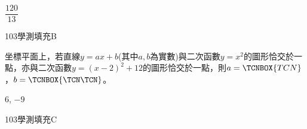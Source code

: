 \begin{QUESTIONS}
\begin{QUESTION}
\begin{QBODY}
\begin{tikzpicture}[scale=1.5]
			\end{tikzpicture}
        \end{QBODY}
        \begin{QFROMS}
        \end{QFROMS}
        \begin{QTAGS}\end{QTAGS}
        \begin{QANS}
            $\dfrac{120}{13}$
        \end{QANS}
        \begin{QSOLLIST}
        \end{QSOLLIST}
        \begin{QEMPTYSPACE}
        \end{QEMPTYSPACE}
    \end{QUESTION}
    \begin{QUESTION}
        \begin{ExamInfo}{103}{學測}{填充}{B}
        \end{ExamInfo}
        \begin{ExamAnsRateInfo}{15}{42}{3}{0}
        \end{ExamAnsRateInfo}
        \begin{QBODY}
            坐標平面上，若直線$y=ax+b$(其中$a,b$為實數)與二次函數$y={{x}^{2}}$的圖形恰交於一點，亦與二次函數$y={{(x-2)}^{2}}+12$的圖形恰交於一點，則$a=\TCNBOX{TCN}$，$b=\TCNBOX{\TCN\TCN}$。
        \end{QBODY}
        \begin{QFROMS}
        \end{QFROMS}
        \begin{QTAGS}\end{QTAGS}
        \begin{QANS}
            $6$, $-9$
        \end{QANS}
        \begin{QSOLLIST}
        \end{QSOLLIST}
        \begin{QEMPTYSPACE}
        \end{QEMPTYSPACE}
    \end{QUESTION}
    \begin{QUESTION}
        \begin{ExamInfo}{103}{學測}{填充}{C}
        \end{ExamInfo}
        \begin{ExamAnsRateInfo}{49}{87}{53}{7}

\end{ExamAnsRateInfo}
\end{QUESTION}
\end{QUESTIONS}
